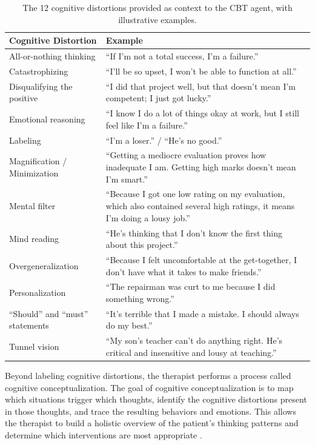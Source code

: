 \documentclass[twoside]{report}
\begin{document}
\begin{table}[h]
\centering
\small
\renewcommand{\arraystretch}{1.4}
\begin{tabular}{|p{4cm}|p{9cm}|}
\hline
\textbf{Cognitive Distortion} & \textbf{Example} \\
\hline
All-or-nothing thinking & ``If I'm not a total success, I'm a failure.'' \\
\hline
Catastrophizing & ``I'll be so upset, I won't be able to function at all.'' \\
\hline
Disqualifying the positive & ``I did that project well, but that doesn't mean I'm competent; I just got lucky.'' \\
\hline
Emotional reasoning & ``I know I do a lot of things okay at work, but I still feel like I'm a failure.'' \\
\hline
Labeling & ``I'm a loser.'' / ``He's no good.'' \\
\hline
Magnification / Minimization & ``Getting a mediocre evaluation proves how inadequate I am. Getting high marks doesn't mean I'm smart.'' \\
\hline
Mental filter & ``Because I got one low rating on my evaluation, which also contained several high ratings, it means I'm doing a lousy job.'' \\
\hline
Mind reading & ``He's thinking that I don't know the first thing about this project.'' \\
\hline
Overgeneralization & ``Because I felt uncomfortable at the get-together, I don't have what it takes to make friends.'' \\
\hline
Personalization & ``The repairman was curt to me because I did something wrong.'' \\
\hline
``Should'' and ``must'' statements & ``It's terrible that I made a mistake. I should always do my best.'' \\
\hline
Tunnel vision & ``My son's teacher can't do anything right. He's critical and insensitive and lousy at teaching.'' \\
\hline
\end{tabular}
\caption{The 12 cognitive distortions provided as context to the CBT agent, with illustrative examples. \cite{beckinstitute2021testing}}
\label{tab:cognitive_distortions}
\end{table}

Beyond labeling cognitive distortions, the therapist performs a process called cognitive conceptualization. The goal of cognitive conceptualization is to map which situations trigger which thoughts, identify the cognitive distortions present in those thoughts, and trace the resulting behaviors and emotions. This allows the therapist to build a holistic overview of the patient's thinking patterns and determine which interventions are most appropriate \cite{beckinstitute2021casewriteup}.
\end{document}
